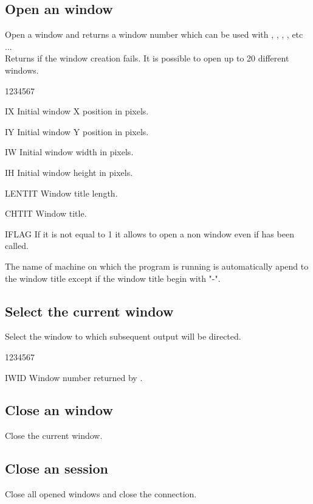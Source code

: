 \subsection{Open an  window}
\Action
Open a  window and returns a window number which can be used with
, , , ,  etc ...\\
Returns  if the window creation fails. It is possible to
open up to 20 different windows.
\Pdesc
\begin{DLtt}{1234567}
\item[IX] Initial window X position in pixels.
\item[IY] Initial window Y position in pixels.
\item[IW] Initial window width in pixels.
\item[IH] Initial window height in pixels.
\item[LENTIT] Window title length.
\item[CHTIT] Window title.
\item[IFLAG] If it is not equal to 1 it allows to open a non \MOTIF{} window
             even if  has been called.
\end{DLtt}
The name of machine on which the program is running is automatically
apend to the window title except if the window title begin with "-".
\subsection{Select the current  window}
%
\Action
Select the window to which subsequent output will be directed.
\Pdesc
\begin{DLtt}{1234567}
\item[IWID] Window number returned by .
\end{DLtt}

\subsection{Close an  window}
%
\Action
Close the current window.
\subsection{Close an  session}
%
\Action
Close all opened windows and close the  connection.
